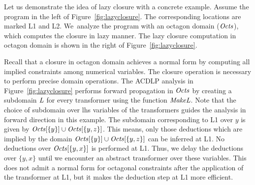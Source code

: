 {Let us demonstrate the idea of lazy closure with a concrete example.  Assume
the program in the left of Figure~\ref{fig:lazyclosure}.  The corresponding
locations are marked L1 and L2.  We~analyze the program with an octagon
domain ($\mathit{Octs}$), which computes the closure in lazy manner.  The lazy
closure computation in octagon domain is shown in the right of
Figure~\ref{fig:lazyclosure}.

Recall that a closure in octagon domain achieves a normal form by computing all
implied constraints among numerical variables. The closure operation is 
necessary to perform precise domain operations.  The ACDLP analysis in
Figure~\ref{fig:lazyclosure} performs forward propagation in $\mathit{Octs}$ by creating a 
subdomain $\mathit{L}$ for every transformer using the function $\mathit{MakeL}$.  
Note that the choice of subdomain over lhs variables of the transformers guides the 
analysis in forward direction in this example. The subdomain 
corresponding to L1 over $y$ is given by 
$\mathit{Octs}[\{y\}]\cup\mathit{Octs}[\{y,z\}]$.  This means, only those deductions 
which are implied by the domain $\mathit{Octs}[\{y\}]\cup\mathit{Octs}[\{y,z\}]$ can be
inferred at L1.  No deductions over $\mathit{Octs}[\{y,x\}]$ is performed at L1.  
Thus, we delay the deductions over $\{y,x\}$ until we encounter an abstract 
transformer over these variables.  This does not admit a normal form for 
octagonal constraints after the application of the transformer at L1, but it 
makes the deduction step at L1 more efficient.  

}
